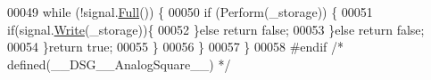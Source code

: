 \begin{DoxyCode}
00049             \textcolor{keywordflow}{while} (!signal.\hyperlink{class_d_s_g_1_1_ring_buffer_a53ddb04ffcbb5470a8d2b0a3c65b70cb}{Full}()) \{
00050                 \textcolor{keywordflow}{if} (Perform(\_storage)) \{
00051                     \textcolor{keywordflow}{if}(signal.\hyperlink{class_d_s_g_1_1_ring_buffer_aa5dd2caa0a270173251faee40a43d692}{Write}(\_storage))\{
00052                     \}\textcolor{keywordflow}{else} \textcolor{keywordflow}{return} \textcolor{keyword}{false};
00053                 \}\textcolor{keywordflow}{else} \textcolor{keywordflow}{return} \textcolor{keyword}{false};
00054             \}\textcolor{keywordflow}{return} \textcolor{keyword}{true};
00055         \}
00056     \}
00057 \}
00058 \textcolor{preprocessor}{#endif }\textcolor{comment}{/* defined(\_\_DSG\_\_AnalogSquare\_\_) */}\textcolor{preprocessor}{}
\end{DoxyCode}
